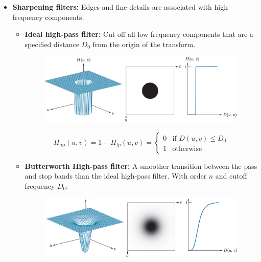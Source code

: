 \begin{itemize}
  \item \textbf{Sharpening filters:} Edges and fine details are
    associated with high frequency components.

    \begin{itemize}
      \item \textbf{Ideal high-pass filter:} Cut off all low
        frequency components that are a specified distance $D_0$ from
        the origin of the transform.

        \begin{minipage}{\linewidth}
          \begin{figure}[H]
            \centering
            \includegraphics[width=\linewidth]{images/ideal_high_pass.png}
          \end{figure}
        \end{minipage}

        \begin{equation*}
          H_\text{hp}(u, v) = 1 - H_\text{lp}(u, v) =
          \begin{cases}
            0 & \text{if } D(u, v) \leq D_0 \\
            1 & \text{otherwise}
          \end{cases}
        \end{equation*}

      \item \textbf{Butterworth High-pass filter:} A smoother
        transition between the pass and stop bands than the ideal high-pass
        filter. With order $n$ and cutoff frequency $D_0$:

        \begin{minipage}{\linewidth}
          \begin{figure}[H]
            \centering
            \includegraphics[width=\linewidth]{images/butterworth_high_pass.png}
          \end{figure}
        \end{minipage}


\end{itemize}
\end{itemize}
